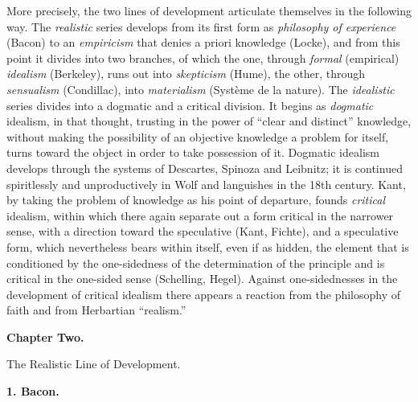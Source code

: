 More precisely, the two lines of development articulate themselves in
the following way. The \emph{realistic} series develops from its first
form as \emph{philosophy of experience} (Bacon) to an \emph{empiricism}
that denies a priori knowledge (Locke), and from this point it divides
into two branches, of which the one, through \emph{formal} (empirical)
\emph{idealism} (Berkeley), runs out into \emph{skepticism} (Hume), the
other, through \emph{sensualism} (Condillac), into \emph{materialism}
(Système de la nature). The \emph{idealistic} series divides into a
dogmatic and a critical division. It begins as \emph{dogmatic} idealism,
in that thought, trusting in the power of ``clear and distinct''
knowledge, without making the possibility of an objective
knowledge a problem for itself, turns toward the object in order to take
possession of it. Dogmatic idealism develops through the systems of
Descartes, Spinoza and Leibnitz; it is continued spiritlessly and
unproductively in Wolf and languishes in the 18th century. Kant, by
taking the problem of knowledge as his point of departure, founds
\emph{critical} idealism, within which there again separate out a form
critical in the narrower sense, with a direction toward the speculative
(Kant, Fichte), and a speculative form, which nevertheless bears within
itself, even if as hidden, the element that is conditioned by the
one-sidedness of the determination of the principle and is critical in
the one-sided sense (Schelling, Hegel). Against one-sidednesses in the
development of critical idealism there appears a reaction from the
philosophy of faith and from Herbartian ``realism.''

\divrule

\begin{center}
  \textbf{Chapter Two.}
\end{center}

\divrule

\begin{center}
  {\large The Realistic Line of Development.}
\end{center}

\divrule

\begin{center}
  \textbf{1. Bacon.}
\end{center}

